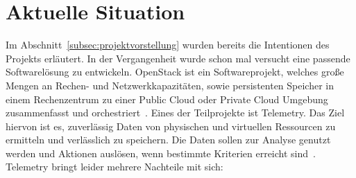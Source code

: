 \section{Aktuelle Situation}
Im Abschnitt~\ref{subsec:projektvorstellung} wurden bereits die Intentionen des
Projekts erläutert. In der Vergangenheit wurde schon mal versucht eine passende
Softwarelösung zu entwickeln. OpenStack ist ein Softwareprojekt, welches große
Mengen an Rechen- und Netzwerkkapazitäten, sowie persistenten Speicher in einem
Rechenzentrum zu einer \gls{Public Cloud} oder \gls{Private Cloud} Umgebung
zusammenfasst und orchestriert~\cite{OpenStack_Intro}. Eines der Teilprojekte
ist Telemetry. Das Ziel hiervon ist es, zuverlässig Daten von physischen und
virtuellen Ressourcen zu ermitteln und verlässlich zu speichern. Die Daten
sollen zur Analyse genutzt werden und Aktionen auslösen, wenn bestimmte
Kriterien erreicht sind~\cite{OpenStack_Telemetry}. Telemetry bringt leider
mehrere Nachteile mit sich:

